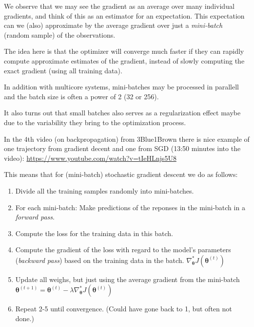 \documentclass[10pt,ignorenonframetext,]{beamer}
\providecommand{\tightlist}{%
  \setlength{\itemsep}{0pt}\setlength{\parskip}{0pt}}
\begin{document}
\begin{frame}

We observe that we may see the gradient as an average over many
individual gradients, and think of this as an estimator for an
expectation. This expectation can we (also) approximate by the average
gradient over just a \emph{mini-batch} (random sample) of the
observations.

The idea here is that the optimizer will converge much faster if they
can rapidly compute approximate estimates of the gradient, instead of
slowly computing the exact gradient (using all training data).

In addition with multicore systems, mini-batches may be processed in
parallell and the batch size is often a power of 2 (32 or 256).

It also turns out that small batches also serves as a regularization
effect maybe due to the variability they bring to the optimization
process.

\end{frame}

\begin{frame}

In the 4th video (on backpropagation) from 3Blue1Brown there is nice
example of one trajectory from gradient decent and one from SGD (13:50
minutes into the video):
\url{https://www.youtube.com/watch?v=tIeHLnjs5U8}

\end{frame}

\begin{frame}

This means that for (mini-batch) stochastic gradient descent we do as
follows:

\begin{enumerate}
\def\labelenumi{\arabic{enumi}.}
\tightlist
\item
  Divide all the training samples randomly into mini-batches.
\item
  For each mini-batch: Make predictions of the reponses in the
  mini-batch in a \emph{forward pass}.
\item
  Compute the loss for the training data in this batch.
\item
  Compute the gradient of the loss with regard to the model's parameters
  (\emph{backward pass}) based on the training data in the batch.
  \(\nabla_{\boldsymbol \theta}^* J({\boldsymbol \theta}^{(t)})\)
\item
  Update all weighs, but just using the average gradient from the
  mini-batch
  \({\boldsymbol \theta}^{(t+1)}={\boldsymbol \theta}^{(t)} - \lambda \nabla_{\boldsymbol \theta} ^* J({\boldsymbol \theta}^{(t)})\)
\item
  Repeat 2-5 until convergence. (Could have gone back to 1, but often
  not done.)
\end{enumerate}

\end{frame}
\end{document}
